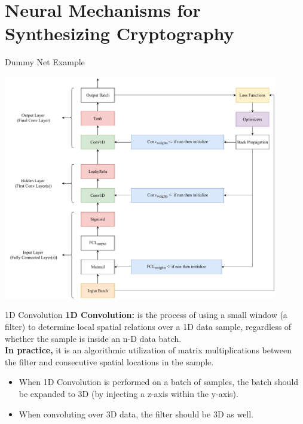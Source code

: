 \documentclass{beamer}
\begin{document}
	\section{Neural Mechanisms for Synthesizing Cryptography}
		\begin{frame}{Dummy Net Example}
			\begin{center}
				\includegraphics[width=0.9\textwidth]{SimpleNetDiagram}
			\end{center}
		\end{frame}
		\begin{frame}{1D Convolution}
			\textbf{1D Convolution:} is the process of using a small window (a filter) to determine local spatial relations over a 1D data sample, regardless of whether the sample is inside an n-D data batch.\\
			\textbf{In practice,} it is an algorithmic utilization of matrix multiplications between the filter and consecutive spatial locations in the sample.\\
			\scriptsize{\begin{itemize}
				\item When 1D Convolution is performed on a batch of samples, the batch should be expanded to 3D (by injecting a z-axis within the y-axis).
				\item When convoluting over 3D data, the filter should be 3D as well. 
			\end{itemize}}
		\end{frame}
\end{document}
